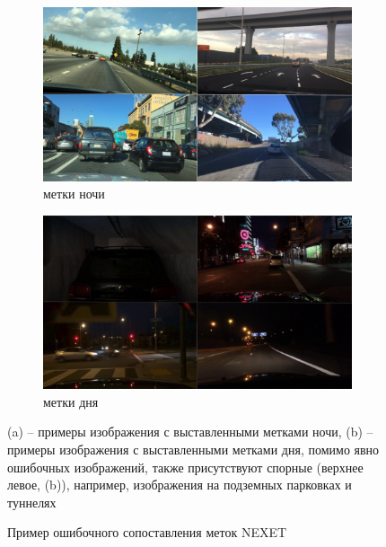 \documentclass[11pt,a4paper]{extarticle}
\begin{document}
{			\begin{figure}[ht]
				\centering
				\begin{subfigure}[ht]{0.49\textwidth}
					\includegraphics[width=\textwidth]{img/nexet_mis_night}
					\caption{метки ночи}
				\end{subfigure}
				\begin{subfigure}[ht]{0.49\textwidth}
					\includegraphics[width=\textwidth]{img/nexet_mis_day}
					\caption{метки дня}
				\end{subfigure}
				\caption{Пример ошибочного сопоставления меток NEXET}{
					\small{
					(a) -- примеры изображения с выставленными метками ночи,
					(b) -- примеры изображения с выставленными метками дня, помимо явно ошибочных изображений, также присутствуют спорные (верхнее левое, (b)), например, изображения на подземных парковках и туннелях
				}}
				\label{pic:nexet_mis}
			\end{figure}

}
\end{document}
